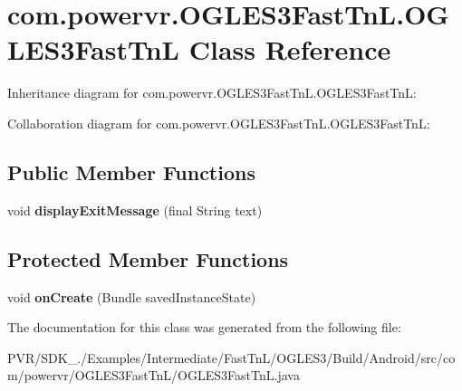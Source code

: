 \hypertarget{classcom_1_1powervr_1_1_o_g_l_e_s3_fast_tn_l_1_1_o_g_l_e_s3_fast_tn_l}{\section{com.\+powervr.\+O\+G\+L\+E\+S3\+Fast\+Tn\+L.\+O\+G\+L\+E\+S3\+Fast\+Tn\+L Class Reference}
\label{classcom_1_1powervr_1_1_o_g_l_e_s3_fast_tn_l_1_1_o_g_l_e_s3_fast_tn_l}
}


Inheritance diagram for com.\+powervr.\+O\+G\+L\+E\+S3\+Fast\+Tn\+L.\+O\+G\+L\+E\+S3\+Fast\+Tn\+L\+:


Collaboration diagram for com.\+powervr.\+O\+G\+L\+E\+S3\+Fast\+Tn\+L.\+O\+G\+L\+E\+S3\+Fast\+Tn\+L\+:
\subsection*{Public Member Functions}
\begin{DoxyCompactItemize}
\item 
\hypertarget{classcom_1_1powervr_1_1_o_g_l_e_s3_fast_tn_l_1_1_o_g_l_e_s3_fast_tn_l_ab085a0eff13ee81464cedbea552566f6}{void {\bfseries display\+Exit\+Message} (final String text)}\label{classcom_1_1powervr_1_1_o_g_l_e_s3_fast_tn_l_1_1_o_g_l_e_s3_fast_tn_l_ab085a0eff13ee81464cedbea552566f6}

\end{DoxyCompactItemize}
\subsection*{Protected Member Functions}
\begin{DoxyCompactItemize}
\item 
\hypertarget{classcom_1_1powervr_1_1_o_g_l_e_s3_fast_tn_l_1_1_o_g_l_e_s3_fast_tn_l_a9ca8ab444d36b815656c8dca16c14ecf}{void {\bfseries on\+Create} (Bundle saved\+Instance\+State)}\label{classcom_1_1powervr_1_1_o_g_l_e_s3_fast_tn_l_1_1_o_g_l_e_s3_fast_tn_l_a9ca8ab444d36b815656c8dca16c14ecf}

\end{DoxyCompactItemize}


The documentation for this class was generated from the following file\+:\begin{DoxyCompactItemize}
\item 
P\+V\+R/\+S\+D\+K\+\_./\+Examples/\+Intermediate/\+Fast\+Tn\+L/\+O\+G\+L\+E\+S3/\+Build/\+Android/src/com/powervr/\+O\+G\+L\+E\+S3\+Fast\+Tn\+L/O\+G\+L\+E\+S3\+Fast\+Tn\+L.\+java\end{DoxyCompactItemize}
